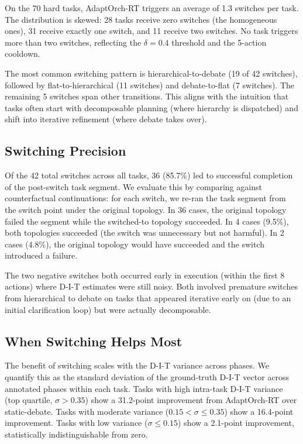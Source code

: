 On the 70 hard tasks, AdaptOrch-RT triggers an average of 1.3 switches
per task. The distribution is skewed: 28 tasks receive zero switches
(the homogeneous ones), 31 receive exactly one switch, and 11 receive
two switches. No task triggers more than two switches, reflecting the
\(\delta = 0.4\) threshold and the 5-action cooldown.

The most common switching pattern is hierarchical-to-debate (19 of 42
switches), followed by flat-to-hierarchical (11 switches) and
debate-to-flat (7 switches). The remaining 5 switches span other
transitions. This aligns with the intuition that tasks often start with
decomposable planning (where hierarchy is dispatched) and shift into
iterative refinement (where debate takes over).

\subsection{Switching Precision}\label{switching-precision}

Of the 42 total switches across all tasks, 36 (85.7\%) led to successful
completion of the post-switch task segment. We evaluate this by
comparing against counterfactual continuations: for each switch, we
re-ran the task segment from the switch point under the original
topology. In 36 cases, the original topology failed the segment while
the switched-to topology succeeded. In 4 cases (9.5\%), both topologies
succeeded (the switch was unnecessary but not harmful). In 2 cases
(4.8\%), the original topology would have succeeded and the switch
introduced a failure.

The two negative switches both occurred early in execution (within the
first 8 actions) where D-I-T estimates were still noisy. Both involved
premature switches from hierarchical to debate on tasks that appeared
iterative early on (due to an initial clarification loop) but were
actually decomposable.

\subsection{When Switching Helps Most}\label{when-switching-helps-most}

The benefit of switching scales with the D-I-T variance across phases.
We quantify this as the standard deviation of the ground-truth D-I-T
vector across annotated phases within each task. Tasks with high
intra-task D-I-T variance (top quartile, \(\sigma > 0.35\)) show a
31.2-point improvement from AdaptOrch-RT over static-debate. Tasks with
moderate variance (\(0.15 < \sigma \leq 0.35\)) show a 16.4-point
improvement. Tasks with low variance (\(\sigma \leq 0.15\)) show a
2.1-point improvement, statistically indistinguishable from zero.

